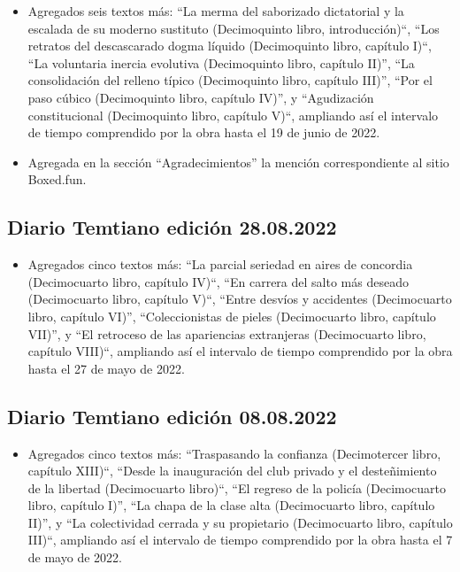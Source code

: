 \documentclass[
]{book}
\providecommand{\tightlist}{%
  \setlength{\itemsep}{0pt}\setlength{\parskip}{0pt}}
\begin{document}
\begin{itemize}
\item
  Agregados seis textos más: ``La merma del saborizado dictatorial y la escalada de su moderno sustituto (Decimoquinto libro, introducción)``, ``Los retratos del descascarado dogma líquido (Decimoquinto libro, capítulo I)``, ``La voluntaria inercia evolutiva (Decimoquinto libro, capítulo II)'', ``La consolidación del relleno típico (Decimoquinto libro, capítulo III)'', ``Por el paso cúbico (Decimoquinto libro, capítulo IV)'', y ``Agudización constitucional (Decimoquinto libro, capítulo V)``, ampliando así el intervalo de tiempo comprendido por la obra hasta el 19 de junio de 2022.
\item
  Agregada en la sección ``Agradecimientos'' la mención correspondiente al sitio Boxed.fun.
\end{itemize}

\hypertarget{diario-temtiano-ediciuxf3n-28.08.2022}{%
\subsection*{Diario Temtiano edición 28.08.2022}\label{diario-temtiano-ediciuxf3n-28.08.2022}}

\begin{itemize}
\tightlist
\item
  Agregados cinco textos más: ``La parcial seriedad en aires de concordia (Decimocuarto libro, capítulo IV)``, ``En carrera del salto más deseado (Decimocuarto libro, capítulo V)``, ``Entre desvíos y accidentes (Decimocuarto libro, capítulo VI)'', ``Coleccionistas de pieles (Decimocuarto libro, capítulo VII)'', y ``El retroceso de las apariencias extranjeras (Decimocuarto libro, capítulo VIII)``, ampliando así el intervalo de tiempo comprendido por la obra hasta el 27 de mayo de 2022.
\end{itemize}

\hypertarget{diario-temtiano-ediciuxf3n-08.08.2022}{%
\subsection*{Diario Temtiano edición 08.08.2022}\label{diario-temtiano-ediciuxf3n-08.08.2022}}

\begin{itemize}
\tightlist
\item
  Agregados cinco textos más: ``Traspasando la confianza (Decimotercer libro, capítulo XIII)``, ``Desde la inauguración del club privado y el desteñimiento de la libertad (Decimocuarto libro)``, ``El regreso de la policía (Decimocuarto libro, capítulo I)'', ``La chapa de la clase alta (Decimocuarto libro, capítulo II)'', y ``La colectividad cerrada y su propietario (Decimocuarto libro, capítulo III)``, ampliando así el intervalo de tiempo comprendido por la obra hasta el 7 de mayo de 2022.
\end{itemize}
\end{document}

